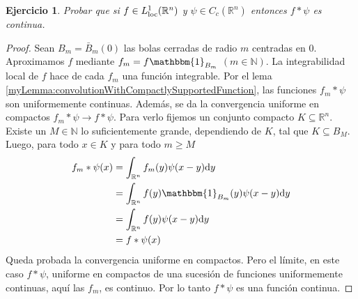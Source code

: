 \documentclass{article}
\newcommand{\characteristic}{\mathbbm{1}}
\newcommand{\naturalNumbers}{\mathbb{N}}
\newcommand{\realNumbers}{\mathbb{R}}
\newcommand{\local}{\textnormal{loc}}
\newtheorem{exercise}{Ejercicio}
\theoremstyle{remark}
\begin{document}
  \begin{exercise}
    \label{exercise:continuousConvolutions}
    Probar que si \(f \in L^1_{\local}(\realNumbers^n)\) y \(\psi \in C_c(\realNumbers^n)\) entonces \(f * \psi\) es continua.
  \end{exercise}
  \begin{proof}
    Sean \(B_m = \bar{B}_m(0)\) las bolas cerradas de radio \(m\) centradas en \(0\).
    Aproximamos \(f\) mediante \(f_m = f \characteristic_{B_m}\) \((m \in \naturalNumbers)\).
    La integrabilidad local de \(f\) hace de cada \(f_m\) una función integrable.
    Por el lema \ref{myLemma:convolutionWithCompactlySupportedFunction}, las funciones \(f_m * \psi\) son uniformemente continuas.
    Además, se da la convergencia uniforme en compactos \(f_m * \psi \rightarrow f * \psi\).
    Para verlo fijemos un conjunto compacto \(K \subseteq \realNumbers^n\).
    Existe un \(M \in \naturalNumbers\) lo suficientemente grande, dependiendo de \(K\), tal que \(K \subseteq B_M\).
    Luego, para todo \(x \in K\) y para todo \(m \geq M\)
    \begin{align}
      f_m * \psi (x)
      &=
      \int_{\realNumbers^n} f_m (y) \psi(x - y) \dd y
      \\
      &=
      \int_{\realNumbers^n} f (y) \characteristic_{B_m} (y) \psi(x - y) \dd y
      \\
      &=
      \int_{\realNumbers^n} f (y) \psi(x - y) \dd y
      \\
      &=
      f * \psi (x)
    \end{align}
    Queda probada la convergencia uniforme en compactos.
    Pero el límite, en este caso \(f * \psi\), uniforme en compactos de una sucesión de funciones uniformemente continuas, aquí las \(f_m\), es continuo.
    Por lo tanto \(f * \psi\) es una función continua.
  \end{proof}
\end{document}
